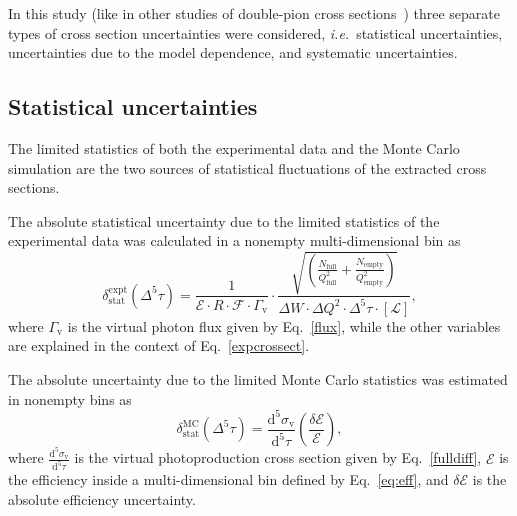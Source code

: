 \documentclass[prc,twocolumn,superscriptaddress,showpacs,amssymb,amsmath,amsfonts,aps,nofootinbib]{revtex4-1}
\begin{document}
In this study (like in other studies of double-pion cross sections~\cite{Rip_an_note:2002,Ripani:2002ss,Fed_an_note:2007,Fedotov:2008aa,Isupov:2017lnd,Arjun,Fed_an_note:2017,Fed_paper_2018}) three separate types of cross section uncertainties were considered, {\it i.e.}~statistical uncertainties, uncertainties due to the model dependence, and systematic uncertainties. 

\subsection{Statistical uncertainties}
\label{Sect:stat_uncert}

The limited statistics of both the experimental data and the Monte Carlo simulation are the two sources of statistical fluctuations of the extracted 
cross sections. 


The absolute statistical  uncertainty due to the limited statistics of the experimental data was calculated in a nonempty multi-dimensional bin as
\begin{equation}
\delta_{\text{stat}}^{\text{expt}}(\Delta^{5} \tau) = \frac{1}{\mathcal{E} \! \cdot \! R \! \cdot \! \mathcal{F} \! \cdot \! \Gamma_{\text{v}} }  \cdot  \frac{\sqrt{\left( \frac{N_{\text{full}}}{Q_{\text{full}}^{2}}+\frac{N_{\text{empty}}}{Q_{\text{empty}}^{2}} \right) } }{
\Delta W \! \cdot \!  \Delta Q^{2} \! \cdot \!  \Delta^{5} \tau \! \cdot \! \left [\mathcal{L} \right ]},%
\label{staterrors}
\end{equation}
where $\Gamma_{\text{v}}$ is the virtual photon flux given by Eq.\!~\eqref{flux}, while the other variables are explained in the context of Eq.\!~\eqref{expcrossect}.


The absolute uncertainty due to the limited Monte Carlo statistics was estimated in nonempty bins as 
\begin{equation}
\delta_{\text{stat}}^{\text{MC}}(\Delta^{5} \tau) = \frac{\textrm{d}^{5}\sigma_{\text{v}}}{\textrm{d}^{5}\tau} \left( \frac{\delta \mathcal{E}}{\mathcal{E}} \right),
\label{montecarloerror}
\end{equation}
where $\frac{\textrm{d}^{5}\sigma_{\text{v}}}{\textrm{d}^{5}\tau}$ is the virtual photoproduction cross section given by Eq.\!~\eqref{fulldiff}, $\mathcal{E}$ is the efficiency inside a multi-dimensional bin defined by Eq.\!~\eqref{eq:eff}, and $\delta \mathcal{E}$ is the absolute efficiency uncertainty. 
\end{document}
